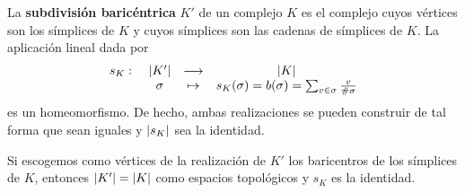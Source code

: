 \begin{definition}\label{subdiv}
  La \textbf{subdivisión baricéntrica} $ K' $ de un complejo $ K $ es el complejo cuyos vértices son los símplices de $ K $ y cuyos símplices son las cadenas de símplices de $ K $. La aplicación lineal dada por
  \begin{gather*}
    \begin{matrix}
    s_K: \ &\abs{K'} &\longrightarrow &\abs{K} \\
    &\sigma  &\mapsto &s_K(\sigma)=b(\sigma) = \sum_{v\in \sigma }\frac{v}{\#\sigma}
    \end{matrix}
  \end{gather*}
  es un homeomorfismo. De hecho, ambas realizaciones se pueden construir de tal forma que sean iguales y $ \abs{s_K }$ sea la identidad.
\end{definition}
\begin{proposition}\label{subdivbar}
  Si escogemos como vértices de la realización de $ K'  $ los baricentros de los símplices de $ K  $, entonces $ \abs{K' } = \abs{K } $ como espacios topológicos y $s_K $ es la identidad.
\end{proposition}
